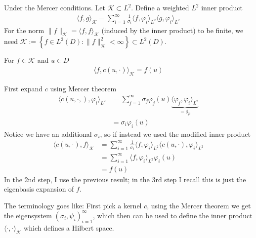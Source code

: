 \documentclass[11pt,fleqn]{article}
\numberwithin{equation}{section}
\theoremstyle{definition}
\theoremstyle{definition}
\renewenvironment{proof}[1][\proofname]{\vspace{-10pt}\begin{replacementproof}}{\end{replacementproof}}
\begin{document}
\begin{definition}
	Under the Mercer conditions. Let $\mathcal K \subset L^2$. Define a weighted $L^2$ inner product
	\begin{align}
		\langle f, g \rangle_{\mathcal K} = \sum_{i=1}^\infty \frac{1}{\sigma_i} \langle f , \varphi_i \rangle_{L^2} \langle g, \varphi_i \rangle_{L^2}
	\end{align}
	For the norm $\|f\|_{\mathcal K} = \langle f, f\rangle_{\mathcal K}$ (induced by the inner product) to be finite, we need $\mathcal K := \left\{ f \in L^2(D) : \| f\|_{\mathcal K}^2 < \infty \right\} \subset L^2(D)$.
\end{definition}
\begin{theorem}[RKHS]
	For $f \in \mathcal K$ and $u \in D$
	\begin{align}
		\langle f , c(u, \cdot) \rangle_{\mathcal K} = f(u)
	\end{align}
\end{theorem}
\begin{proof}
	First expand $c$ using Mercer theorem
	\begin{align}
		\langle c(u, \cdot,), \varphi_i\rangle_{L^2} & = \sum_{j=1}^\infty \sigma_j \varphi_j(u) \underbrace{\langle \varphi_j, \varphi_i\rangle_{L^2}}_{=\delta_{ji}}\\
		& = \sigma_i \varphi_i(u)
	\end{align}
	Notice we have an additional $\sigma_i$, so if instead we used the modified inner product
	\begin{align}
		\langle c(u, \cdot), f\rangle_{\mathcal K} & = \sum_{i=1}^\infty \frac{1}{\sigma_i} \langle f, \varphi_i \rangle_{L^2} \langle c(u, \cdot) , \varphi_i\rangle_{L^2}\\
		& = \sum_{i=1}^\infty \langle f , \varphi_i \rangle_{L^2} \varphi_i(u)\\
		& = f(u)
	\end{align}
	In the 2nd step, I use the previous result; in the 3rd step I recall this is just the eigenbasis expansion of $f$.
\end{proof}
The terminology goes like: First pick a kernel $c$, using the Mercer theorem we get the eigensystem $(\sigma_i, \psi_i)_{i=1}^\infty$, which then can be used to define the inner product $\langle \cdot, \cdot \rangle_{\mathcal K}$ which defines a Hilbert space.
\end{document}
